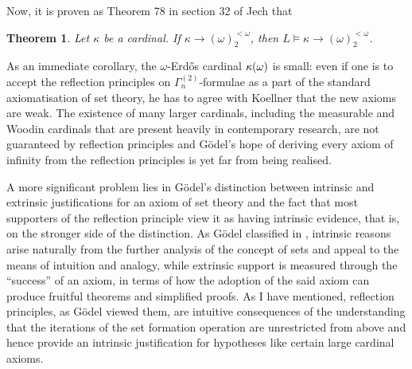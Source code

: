 \documentclass[12pt]{article}
\theoremstyle{plain}
\newtheorem{theorem}{Theorem}[section]
\theoremstyle{definition}
\begin{document}
Now, it is proven as Theorem 78 in section 32 of Jech \cite{jech-set-theory} that

\begin{theorem}
	Let $\kappa$ be a cardinal. If $\kappa \rightarrow \left(\omega\right)^{<\omega}_2$, then $L \vDash \kappa \rightarrow \left(\omega \right)^{<\omega}_2$.
\end{theorem}

As an immediate corollary, the $\omega$-Erd\H{o}s cardinal $\kappa\mleft(\omega\mright)$ is small: even if one is to accept the reflection principles on $\Gamma^{(2)}_n$-formulae as a part of the standard axiomatisation of set theory, he has to agree with Koellner that the new axioms are weak. The existence of many larger cardinals, including the measurable and Woodin cardinals that are present heavily in contemporary research, are not guaranteed by reflection principles and G\"odel's hope of deriving every axiom of infinity from the reflection principles is yet far from being realised.

A more significant problem lies in G\"odel's distinction between intrinsic and extrinsic justifications for an axiom of set theory and the fact that most supporters of the reflection principle view it as having intrinsic evidence, that is, on the stronger side of the distinction. As G\"odel classified in \cite{godel-continuum-axioms}, intrinsic reasons arise naturally from the further analysis of the concept of sets and appeal to the means of intuition and analogy, while extrinsic support is measured through the ``success'' of an axiom, in terms of how the adoption of the said axiom can produce fruitful theorems and simplified proofs. As I have mentioned, reflection principles, as G\"odel viewed them, are intuitive consequences of the understanding that the iterations of the set formation operation are unrestricted from above and hence provide an intrinsic justification for hypotheses like certain large cardinal axioms.
\end{document}
